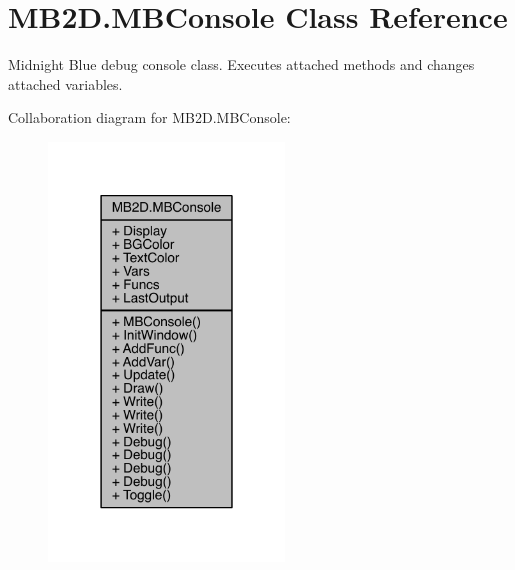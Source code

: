\hypertarget{class_m_b2_d_1_1_m_b_console}{}\section{M\+B2\+D.\+M\+B\+Console Class Reference}
\label{class_m_b2_d_1_1_m_b_console}


Midnight Blue debug console class. Executes attached methods and changes attached variables.  




Collaboration diagram for M\+B2\+D.\+M\+B\+Console\+:
\nopagebreak
\begin{figure}[H]
\begin{center}
\leavevmode
\includegraphics[width=178pt]{class_m_b2_d_1_1_m_b_console__coll__graph}
\end{center}
\end{figure}

